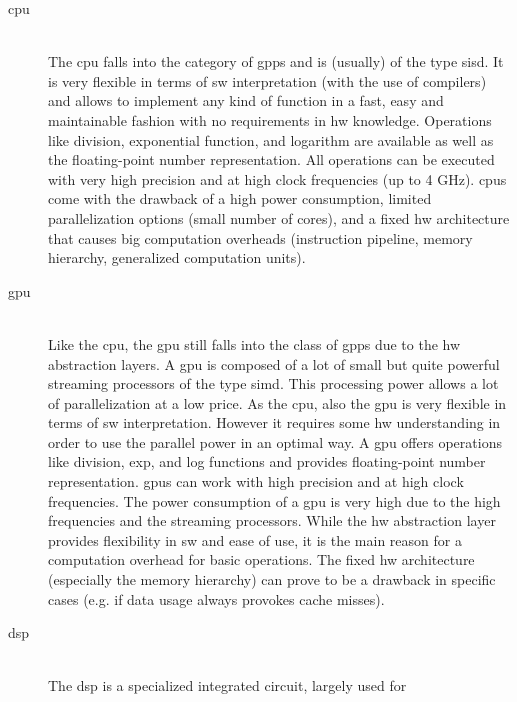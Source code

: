 \documentclass[mscthesis]{usiinfthesis}
\begin{document}
\begin{description}
    \item[\acrshort{cpu}] \hfill \\
        The \acrfull{cpu} falls into the category of \glspl{gpp} and is
        (usually) of the type \gls{sisd}. It is very flexible in terms of
        \gls{sw} interpretation (with the use of compilers) and allows to
        implement any kind of function in a fast, easy and maintainable fashion
        with no requirements in \gls{hw} knowledge. Operations like division,
        exponential function, and logarithm are available as well as the
        floating-point number representation. All operations can be executed
        with very high precision and at high clock frequencies (up to 4 GHz).
        \glspl{cpu} come with the drawback of a high power consumption, limited
        parallelization options (small number of cores), and a fixed \gls{hw}
        architecture that causes big computation overheads (instruction
        pipeline, memory hierarchy, generalized computation units).
    \item[\acrshort{gpu}] \hfill \\
        Like the \gls{cpu}, the \acrfull{gpu} still falls into the class of
        \glspl{gpp} due to the \gls{hw} abstraction layers. A \gls{gpu} is
        composed of a lot of small but quite powerful streaming processors of
        the type \gls{simd}. This processing power allows a lot of
        parallelization at a low price. As the \gls{cpu}, also the \gls{gpu} is
        very flexible in terms of \gls{sw} interpretation. However it requires
        some \gls{hw} understanding in order to use the parallel power in an
        optimal way. A \gls{gpu} offers operations like division, exp, and log
        functions and provides floating-point number representation.
        \glspl{gpu} can work with high precision and at high clock frequencies.
        The power consumption of a \gls{gpu} is very high due to the high
        frequencies and the streaming processors. While the \gls{hw}
        abstraction layer provides flexibility in \gls{sw} and ease of use, it
        is the main reason for a computation overhead for basic operations. The
        fixed \gls{hw} architecture (especially the memory hierarchy) can prove
        to be a drawback in specific cases (e.g. if data usage always provokes
        cache misses).
    \item[\acrshort{dsp}] \hfill \\
        The \acrfull{dsp} is a specialized integrated circuit, largely used for

\end{description}
\end{document}
